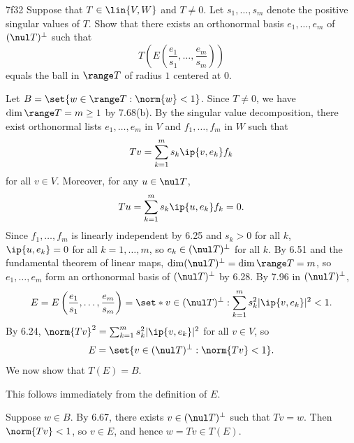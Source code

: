 \begin{exercise}{7f32}
    Suppose that $T \in \lin{V, W}$ and $T \neq 0$.
    Let $s_1, \ldots, s_m$ denote the positive singular values of $T$.
    Show that there exists an orthonormal basis $e_1, \ldots, e_m$ of $(\nul T)^\perp$ such that
    \[
        T\left(E\left(\frac{e_1}{s_1}, \ldots, \frac{e_m}{s_m}\right)\right)
    \]
    equals the ball in $\range T$ of radius $1$ centered at $0$.
\end{exercise}

\begin{sol}
    Let $B = \set{w \in \range T : \norm{w} < 1}$.
    Since $T \neq 0$, we have $\dim \range T = m \geq 1$ by 7.68(b).
    By the singular value decomposition, there exist orthonormal lists $e_1, \ldots, e_m$ in $V$ and $f_1, \ldots, f_m$ in $W$ such that
    \[
        T v = \sum_{k=1}^m s_k \ip{v, e_k} f_k
    \]
    for all $v \in V$.
    Moreover, for any $u \in \nul T$,
    \[
        T u = \sum_{k=1}^m s_k \ip{u, e_k} f_k = 0.
    \]
    Since $f_1, \ldots, f_m$ is linearly independent by 6.25 and $s_k > 0$ for all $k$, $\ip{u, e_k} = 0$ for all $k = 1, \ldots, m$, so $e_k \in (\nul T)^\perp$ for all $k$.
    By 6.51 and the fundamental theorem of linear maps, $\dim(\nul T)^\perp = \dim \range T = m$, so $e_1, \ldots, e_m$ form an orthonormal basis of $(\nul T)^\perp$ by 6.28.
    By 7.96 in $(\nul T)^\perp$,
    \[
        E = E\left(\frac{e_1}{s_1}, \ldots, \frac{e_m}{s_m}\right) = \set*{v \in (\nul T)^\perp : \sum_{k=1}^m s_k^2 |\ip{v, e_k}|^2 < 1}.
    \]
    By 6.24, $\norm{T v}^2 = \sum_{k=1}^m s_k^2 |\ip{v, e_k}|^2$ for all $v \in V$, so
    \[
        E = \set{v \in (\nul T)^\perp : \norm{T v} < 1}.
    \]
    We now show that $T(E) = B$.

    \rightset This follows immediately from the definition of $E$.

    \leftset Suppose $w \in B$.
    By 6.67, there exists $v \in (\nul T)^\perp$ such that $T v = w$.
    Then $\norm{T v} < 1$, so $v \in E$, and hence $w = T v \in T(E)$.
\end{sol}